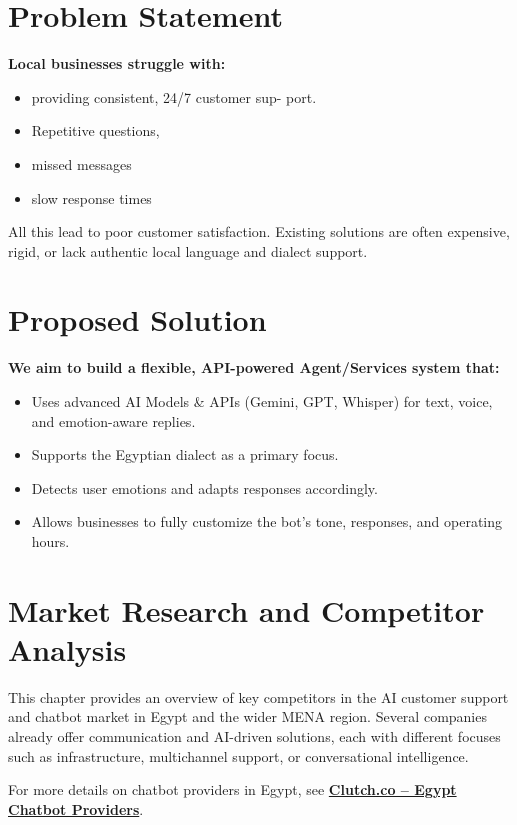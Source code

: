 \documentclass[20pt,a4paper]{article}
\begin{document}
\section{Problem Statement}
\textbf{Local businesses struggle with:}
\begin{itemize}[noitemsep]
    \item providing consistent, 24/7 customer sup-
port.
    \item Repetitive questions,
    \item missed messages
    \item slow response times
\end{itemize}
    
All this lead to poor customer satisfaction. Existing solutions are often expensive, rigid, or lack authentic local
language and dialect support.

\section{Proposed Solution}
\textbf{We aim to build a flexible, API-powered Agent/Services system that:}
\begin{itemize}[noitemsep]
    \item Uses advanced AI Models \& APIs (Gemini, GPT, Whisper) for text, voice, and emotion-aware
replies.
    \item Supports the Egyptian dialect as a primary focus.
    \item Detects user emotions and adapts responses accordingly.
    \item Allows businesses to fully customize the bot’s tone, responses, and operating hours.
\end{itemize}


\section{Market Research and Competitor Analysis}

This chapter provides an overview of key competitors in the AI customer support and 
chatbot market in Egypt and the wider MENA region. Several companies already offer 
communication and AI-driven solutions, each with different focuses such as 
infrastructure, multichannel support, or conversational intelligence.

For more details on chatbot providers in Egypt, see 
\href{https://clutch.co/eg/developers/artificial-intelligence/chatbots?utm_source=chatgpt.com}{\textbf{Clutch.co – Egypt Chatbot Providers}}.
\end{document}

